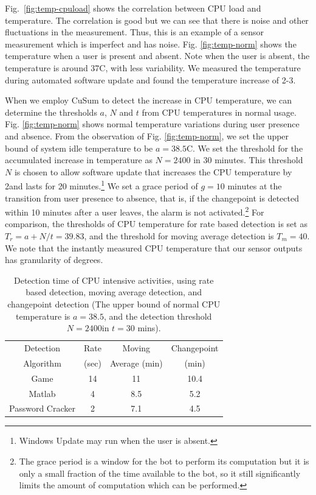 Fig.~\ref{fig:temp-cpuload} shows the correlation between CPU load
and temperature.
The correlation is good but we can see that there is
noise and other fluctuations in the measurement.
Thus, this is an example of a sensor measurement which is imperfect and
has noise.
Fig. \ref{fig:temp-norm} shows the temperature when a user
is present and absent. Note when the user is absent, the temperature
is around 37\degree C, with less variability.  We measured the
temperature during automated software update and found the
temperature increase of 2-3\degree.

When we employ CuSum to detect the increase in CPU temperature, we can determine the thresholds $a$, $N$ and $t$ from CPU temperatures in normal usage. Fig.
\ref{fig:temp-norm} shows normal temperature variations during user
presence and absence. From the observation of Fig.
\ref{fig:temp-norm}, we set the upper bound of system idle
temperature to be $a=38.5$\degree C. We set the threshold for
the accumulated increase in temperature as $N=2400$ in 30 minutes.
This threshold $N$ is chosen to allow software update that increases
the CPU temperature by 2\degree and lasts for 20 minutes.\footnote{
Windows Update may run when the user is absent.
}
We set a grace period of $g=10$ minutes at the transition
from user presence to absence, that is, if the changepoint is
detected within 10 minutes after a user leaves, the alarm is not
activated.\footnote{
The grace period is a window for the bot to perform its computation but
it is only a small fraction of the time available to the bot, so it still
significantly limits the amount of computation which can be performed.
}
For comparison, the thresholds of CPU temperature for rate based detection is set as $T_r = a + N/t = 39.83$\degree, and the threshold for moving average detection is $T_m = 40$\degree. We note that the instantly measured CPU temperature that our sensor outputs has granularity of degrees.

\begin{table}[tb]
  \centering
  \begin{tabular}{|c|c|c|c|}
  \hline
  Detection & Rate & Moving & Changepoint \\
  Algorithm & (sec) & Average (min) & (min) \\
  \hline
  Game            & 14 & 11  & 10.4   \\
  \hline
  Matlab           & 4 & 8.5 & 5.2   \\
  \hline
  Password Cracker & 2 & 7.1 & 4.5   \\ [0.5ex]
  \hline
  \end{tabular}
  \caption{Detection time of CPU intensive activities, using rate based detection, moving average detection, and changepoint detection (The upper bound of normal CPU temperature is $a=38.5$\degree, and the detection threshold $N=2400$\degree in $t=30$ mins).}
  \label{tbl:detect-CPU}
\end{table}

